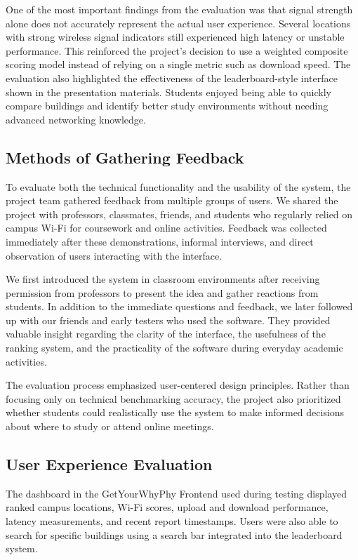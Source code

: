 \documentclass[sigconf]{acmart}
\begin{document}
One of the most important findings from the evaluation was that signal strength alone does not accurately represent the actual user experience. Several locations with strong wireless signal indicators still experienced high latency or unstable performance. This reinforced the project’s decision to use a weighted composite scoring model instead of relying on a single metric such as download speed. The evaluation also highlighted the effectiveness of the leaderboard-style interface shown in the presentation materials. Students enjoyed being able to quickly compare buildings and identify better study environments without needing advanced networking knowledge.

\subsection{Methods of Gathering Feedback}

To evaluate both the technical functionality and the usability of the system, the project team gathered feedback from multiple groups of users. We shared the project with professors, classmates, friends, and students who regularly relied on campus Wi-Fi for coursework and online activities. Feedback was collected immediately after these demonstrations, informal interviews, and direct observation of users interacting with the interface.

We first introduced the system in classroom environments after receiving permission from professors to present the idea and gather reactions from students. In addition to the immediate questions and feedback, we later followed up with our friends and early testers who used the software. They provided valuable insight regarding the clarity of the interface, the usefulness of the ranking system, and the practicality of the software during everyday academic activities.

The evaluation process emphasized user-centered design principles. Rather than focusing only on technical benchmarking accuracy, the project also prioritized whether students could realistically use the system to make informed decisions about where to study or attend online meetings.

\subsection{User Experience Evaluation}
The dashboard in the GetYourWhyPhy Frontend used during testing displayed ranked campus locations, Wi-Fi scores, upload and download performance, latency measurements, and recent report timestamps. Users were also able to search for specific buildings using a search bar integrated into the leaderboard system.
\end{document}
